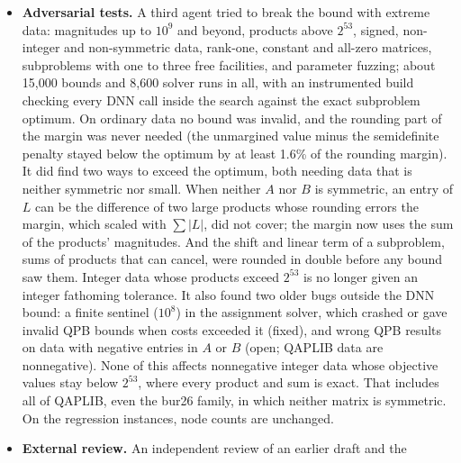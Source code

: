 \documentclass[10pt]{article}
\theoremstyle{remark}
\begin{document}
\begin{itemize}
  $m\le7$ (asymmetric and negative data, ties, scales up to $10^6$), 540
  warm-started children, an independent long-double check of the face
  transforms (error at most $2.1\,u\|Z\|_F$ against the $64\,m\,u\|Z\|_F$
  allowed), 21,000 random assignment problems against the Hungarian solver,
  and determinism tests, under address, undefined-behavior and leak sanitizers.
  No bound exceeded an optimum and nothing crashed. Its minor findings (and the
  mathematical review's) were fixed: a loop that could skip the last Cholesky
  attempt, widened error constants, an explicit finiteness test on the
  certified value, and skipping the bound while there is no incumbent.
\item \textbf{Adversarial tests.} A third agent tried to break the bound with
  extreme data: magnitudes up to $10^{9}$ and beyond, products above $2^{53}$,
  signed, non-integer and non-symmetric data, rank-one, constant and all-zero
  matrices, subproblems with one to three free facilities, and parameter
  fuzzing; about 15,000 bounds and 8,600 solver runs in all, with an
  instrumented build checking every DNN call inside the search against the
  exact subproblem optimum. On ordinary data no bound was invalid, and the
  rounding part of the margin was never needed (the unmargined value minus the
  semidefinite penalty stayed below the optimum by at least 1.6\% of the rounding
  margin). It did find two ways to exceed the optimum, both needing data that is
  neither symmetric nor small. When neither $A$ nor $B$ is symmetric, an entry of
  $L$ can be the difference of two large products whose rounding errors the
  margin, which scaled with $\sum|L|$, did not cover; the margin now uses the sum
  of the products' magnitudes. And the shift and linear term of a subproblem, sums
  of products that can cancel, were rounded in double before any bound saw them.
  Integer data whose products exceed $2^{53}$ is no longer given an integer
  fathoming tolerance. It also found
  two older bugs outside the DNN bound: a finite sentinel ($10^8$) in the
  assignment solver, which crashed or gave invalid QPB bounds when costs exceeded
  it (fixed), and wrong QPB results on data with negative entries in $A$ or $B$
  (open; QAPLIB data are nonnegative). None of this affects nonnegative integer
  data whose objective values stay below $2^{53}$, where every product and sum is
  exact. That includes all of QAPLIB, even the bur26 family, in which neither
  matrix is symmetric. On the regression instances, node counts are unchanged.
\item \textbf{External review.} An independent review of an earlier draft and the

\end{itemize}
\end{document}
